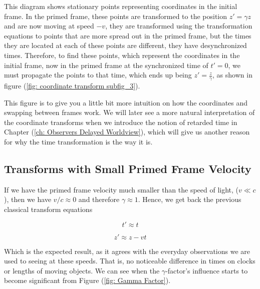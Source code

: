 This diagram shows stationary points representing coordinates in the initial frame.
In the primed frame, these points are transformed to the position ${z{'}} = {\gamma} {z}$ and are now moving at speed $-{v}$, they are transformed using the transformation equations to points that are more spread out in the primed frame, but the times they are located at each of these points are different, they have desynchronized times.
Therefore, to find these points, which represent the coordinates in the initial frame, now in the primed frame at the synchronized time of ${t{'}} = 0$, we must propagate the points to that time, which ends up being ${z{'}} = \frac{{z}}{{\gamma}}$, as shown in figure (\ref{fig: coordinate transform subfig_3}).

This figure is to give you a little bit more intuition on how the coordinates and swapping between frames work.
We will later see a more natural interpretation of the coordinate transforms when we introduce the notion of retarded time in Chapter (\ref{ch: Observers Delayed Worldview}), which will give us another reason for why the time transformation is the way it is.

\subsection{Transforms with Small Primed Frame Velocity} \label{subsect: Transforms with Slow Primed Frame Velocity}

If we have the primed frame velocity much smaller than the speed of light, ($v \ll c$), then we have ${v}/{c}\approx 0$ and therefore $\gamma \approx 1$.
Hence, we get back the previous classical transform equations

\begin{equation}
	{t{'}} \approx t
\end{equation}

\begin{equation}
	z{'} \approx {z}-{v}{t}
\end{equation}

Which is the expected result, as it agrees with the everyday observations we are used to seeing at these speeds.
That is, no noticeable difference in times on clocks or lengths of moving objects.
We can see when the $\gamma$-factor's influence starts to become significant from Figure (\ref{fig: Gamma Factor}).

